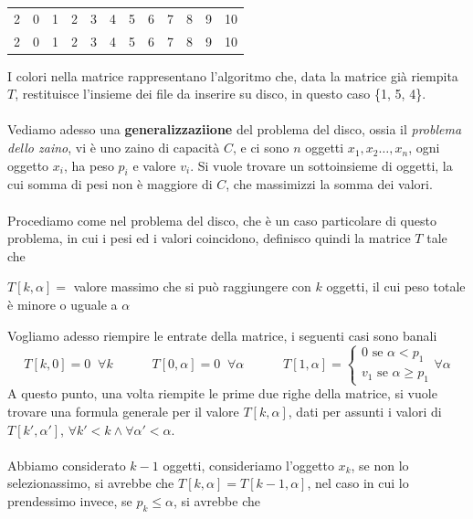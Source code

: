 \documentclass[12pt, letterpaper]{article}
\newcommand{\acc}{\\\hphantom{}\\}
\begin{document}
\begin{center}
\begin{tabular}{c|ccccccccccc}
        2                         & 0 & 1                         & 2                         & 3                         & 4                         & 5                         & 6                                                & 7                         & 8                         & 9                         & \cellcolor[HTML]{9AFF99}10                       \\
        2                         & 0 & 1                         & 2                         & 3                         & 4                         & 5                         & 6                                                & 7                         & 8                         & 9                         & \cellcolor[HTML]{FFCCC9}10
    \end{tabular}
\end{center}
I colori nella matrice rappresentano l'algoritmo che,
data la matrice già riempita $T$, restituisce l'insieme dei file da inserire su disco, in questo caso \{1, 5, 4\}. \acc
Vediamo adesso una \textbf{generalizzaziione} del problema del disco, ossia il \textit{problema dello zaino}, vi è uno zaino
di capacità $C$, e ci sono $n$ oggetti $x_1,x_2\dots,x_n$, ogni oggetto $x_i$, ha peso $p_i$ e valore $v_i$. Si vuole trovare un
sottoinsieme di oggetti, la cui somma di pesi non è maggiore di $C$, che massimizzi la somma dei valori.\acc
Procediamo come nel problema del disco, che è un caso particolare di questo problema, in cui i pesi ed i valori coincidono,
definisco quindi la matrice $T$ tale che\begin{center}
    $T[k,\alpha]=$ valore massimo che si può raggiungere con $k$ oggetti, il cui peso totale è minore o uguale a $\alpha$
\end{center}
Vogliamo adesso riempire le entrate della matrice, i seguenti casi sono banali
$$T[k,0]=0\;\;\forall k\;\;\;\;\;\;\;\;\;\;\;T[0,\alpha]=0\;\;\forall \alpha\;\;\;\;\;\;\;\;\;\;\;T[1,\alpha]=\begin{cases}
        0\text{ se }\alpha<p_1 \\
        v_1\text{ se }\alpha\ge p_1
    \end{cases}\forall \alpha$$
A questo punto, una volta riempite le prime due righe della matrice, si vuole trovare una formula generale per
il valore $T[k,\alpha]$, dati
per assunti i valori di $T[k',\alpha']$, $\forall k'<k\land \forall \alpha'<\alpha$. \acc
Abbiamo considerato $k-1$ oggetti, consideriamo l'oggetto $x_k$, se non lo selezionassimo, si avrebbe che
$T[k,\alpha]=T[k-1,\alpha]$, nel caso in cui lo prendessimo invece, se $p_k\le \alpha$, si avrebbe che
\end{document}
